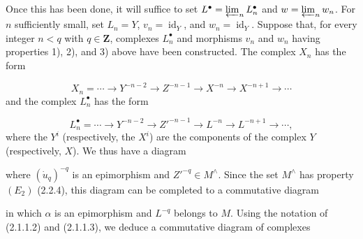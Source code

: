 \clearpage
{}%
\begingroup\small\setlength{\parskip}{0pt}\setlength{\emergencystretch}{1.5em}
\setlength{\abovedisplayskip}{4pt plus 2pt minus 2pt}%
\setlength{\belowdisplayskip}{4pt plus 2pt minus 2pt}%

Once this has been done, it will suffice to set
$L^\bullet=\varprojlim_n L_n^\bullet$ and
$w=\varprojlim_n w_n$. For $n$ sufficiently small, set
$L_n=Y$, $v_n=\operatorname{id}_Y$, and
$w_n=\operatorname{id}_Y$. Suppose that, for every integer $n<q$ with
$q\in\mathbf Z$, complexes $L_n^\bullet$ and morphisms $v_n$ and $w_n$
having properties 1), 2), and 3) above have been constructed. The complex
$X_n$ has the form

\[
X_n=\cdots\longrightarrow Y^{-n-2}\longrightarrow Z^{-n-1}
\longrightarrow X^{-n}\longrightarrow X^{-n+1}\longrightarrow\cdots
\]
and the complex $L_n^\bullet$ has the form

\[
L_n^\bullet=\cdots\longrightarrow Y^{-n-2}\longrightarrow Z'^{-n-1}
\longrightarrow L^{-n}\longrightarrow L^{-n+1}\longrightarrow\cdots,
\]
where the $Y^i$ (respectively, the $X^i$) are the components of the complex
$Y$ (respectively, $X$). We thus have a diagram

\begin{center}
\end{center}
where $(\dot u_q)^{-q}$ is an epimorphism and $Z'^{-q}\in M^\wedge$.
Since the set $M^\wedge$ has property $(E_2)$ (2.2.4), this diagram can be
completed to a commutative diagram

\begin{center}
\end{center}
in which $\alpha$ is an epimorphism and $L^{-q}$ belongs to $M$. Using the
notation of (2.1.1.2) and (2.1.1.3), we deduce a commutative diagram of
complexes

\begin{center}
\end{center}
\endgroup

